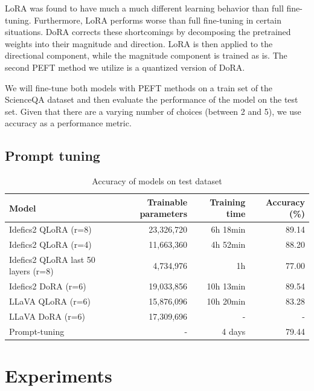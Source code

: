 \documentclass{article}
\begin{document}
LoRA was found to have much a much different learning behavior than full fine-tuning. Furthermore, LoRA performs worse than full fine-tuning in certain situations. DoRA corrects these shortcomings by decomposing the pretrained weights into their magnitude and direction. LoRA is then applied to the directional component, while the magnitude component is trained as is. The second PEFT method we utilize is a quantized version of DoRA.

We will fine-tune both models with PEFT methods on a train set of the ScienceQA dataset and then evaluate the performance of the model on the test set. Given that there are a varying number of choices (between 2 and 5), we use accuracy as a performance metric.

\subsection{Prompt tuning}

\begin{table}[t]
  \centering
  \begin{tabular}{lrrr}
    \hline
    Model & Trainable parameters & Training time & Accuracy (\%)\\ 
    \hline
    Idefics2 QLoRA (r=8) & 23,326,720 & 6h 18min & 89.14\\ 
    Idefics2 QLoRA (r=4) & 11,663,360 & 4h 52min & 88.20\\ 
    Idefics2 QLoRA last 50 layers (r=8) & 4,734,976 & 1h & 77.00\\
    Idefics2 DoRA (r=6) & 19,033,856 & 10h 13min & 89.54\\
    LLaVA QLoRA (r=6) & 15,876,096 & 10h 20min & 83.28\\
    LLaVA DoRA (r=6) & 17,309,696 & - & -\\
    Prompt-tuning & - & 4 days & 79.44\\
    \hline
  \end{tabular}
  \caption{Accuracy of models on test dataset}
  \label{tab:model_performance}
\end{table}

\section{Experiments}
\label{sec:experiments}
\end{document}
